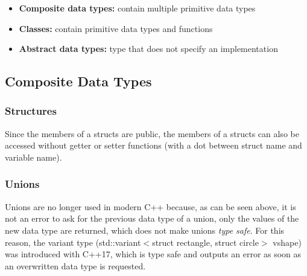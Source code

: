 

\begin{itemize}
    \item \textbf{Composite data types:} contain multiple primitive data types
    \item \textbf{Classes:} contain primitive data types and functions
    \item \textbf{Abstract data types:} type that does not specify an implementation
\end{itemize}


\subsection{Composite Data Types}

\subsubsection{Structures}


Since the members of a structs are public, the members of a structs can also be accessed without getter or setter functions (with a dot between struct name and variable name).

%

\subsubsection{Unions}


%

Unions are no longer used in modern C++ because, as can be seen above, it is not an error to ask for the previous data type of a union, only the values of the new data type are returned, which does not make unions \emph{type safe}. For this reason, the variant type (std::variant$<$struct rectangle, struct circle$>$ vshape) was introduced with C++17, which is type safe and outputs an error as soon as an overwritten data type is requested. 


